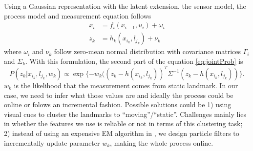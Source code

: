 Using a Gaussian representation with the latent extension, the sensor
model, the process model and measurement equation follows
\begin{equation}
\begin{aligned}
x_i &= f_i(x_{i-1}, u_i) + \omega_i \\
z_k &= h_k(x_{i_k}, l_{j_k}) + \nu_k
\end{aligned}
\end{equation}
where $\omega_i$ and $\nu_k$ follow zero-mean normal distribution with covariance matrices $\Gamma_i$ and $\Sigma_k$. With this formulation, the second part of the equation \ref{eq:jointProb} is
\begin{equation}
P(z_k|x_{i_k}, l_{j_k}, w_k)\propto \exp\{-w_k((z_k - h(x_{i_k}, l_{j_k}))^T\Sigma^{-1}(z_k - h(x_{i_k}, l_{j_k}))\}.
\label{eq:sensor}
\end{equation}
$w_k$ is the likelihood that the measurement comes from static landmark. In our case, we need to infer what those values are and ideally the process could be online or folows an incremental fashion. Possible solutions could be 1) using visual cues to cluster the landmarks to ``moving''/``static''. Challenges mainly lies in whether the features we use is reliable or not in terms of this clustering task; 2) instead of using an expensive EM algorithm in \cite{rogers2010slam}, we design particle filters to incrementally update parameter $w_k$, making the whole process online.

